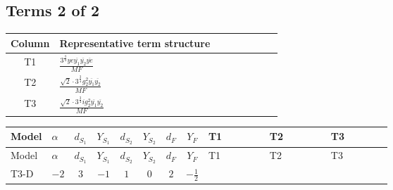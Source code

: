 \documentclass[8pt]{article}
\begin{document}
\begin{landscape}
\subsection*{Terms 2 of 2}
\begin{center}
\begin{tabular}{@{}c >{\raggedright\arraybackslash}p{0.82\linewidth}@{}}
\toprule
Column & Representative term structure \\
\midrule
T1 & \(\displaystyle \frac{3^{\frac{3}{4}} ye \overline{y_{1}} \overline{y_{2}} \overline{ye}}{MF}\) \\
\midrule
T2 & \(\displaystyle \frac{\sqrt{2} \cdot 3^{\frac{3}{4}} g_{2}^{2} \overline{y_{1}} \overline{y_{2}}}{MF}\) \\
\midrule
T3 & \(\displaystyle \frac{\sqrt{2} \cdot 3^{\frac{3}{4}} i g_{2}^{2} \overline{y_{1}} \overline{y_{2}}}{MF}\) \\
\midrule
\bottomrule
\end{tabular}
\end{center}
\smallskip
\tiny
\begin{longtable}{@{}llcccccc >{\raggedright\arraybackslash}p{0.21\linewidth} >{\raggedright\arraybackslash}p{0.21\linewidth} >{\raggedright\arraybackslash}p{0.21\linewidth}@{}}
\toprule
Model & $\alpha$ & $d_{S_1}$ & $Y_{S_1}$ & $d_{S_2}$ & $Y_{S_2}$ & $d_F$ & $Y_F$ & T1 & T2 & T3 \\
\midrule
\endfirsthead
\toprule
Model & $\alpha$ & $d_{S_1}$ & $Y_{S_1}$ & $d_{S_2}$ & $Y_{S_2}$ & $d_F$ & $Y_F$ & T1 & T2 & T3 \\
\midrule
\endhead
T3-D & $-2$ & $3$ & $-1$ & $1$ & $0$ & $2$ & $-\frac{1}{2}$ & \scriptsize\adjustbox{max width=\linewidth}{$\begin{gathered} - \frac{3^{\frac{3}{4}} ye \overline{y_{1}} \overline{y_{2}} \overline{ye}}{12 MF}\end{gathered}$} & \scriptsize\adjustbox{max width=\linewidth}{$\begin{gathered} \frac{\sqrt{2} \cdot 3^{\frac{3}{4}} g_{2}^{2} \overline{y_{1}} \overline{y_{2}}}{6 MF}\end{gathered}$} & \scriptsize\adjustbox{max width=\linewidth}{$\begin{gathered} \frac{\sqrt{2} \cdot 3^{\frac{3}{4}} i g_{2}^{2} \overline{y_{1}} \overline{y_{2}}}{6 MF}\end{gathered}$} \\
\midrule
\bottomrule
\end{longtable}
\clearpage

\end{landscape}
\end{document}
